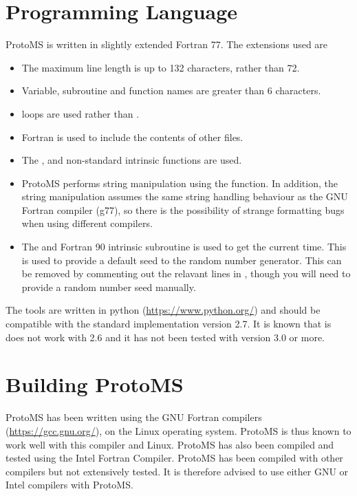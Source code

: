 \documentclass[letterpaper,10pt,english]{sphinxmanual}
\begin{document}
\section{Programming Language}
\label{compilation:fortran77}\label{compilation:programming-language}
ProtoMS is written in slightly extended Fortran 77. The extensions used are
\begin{itemize}
\item {} 
The maximum line length is up to 132 characters, rather than 72.

\item {} 
Variable, subroutine and function names are greater than 6 characters.

\item {} 
 loops are used rather than .

\item {} 
Fortran  is used to include the contents of other files.

\item {} 
The ,  and  non-standard intrinsic functions are used.

\item {} 
ProtoMS performs string manipulation using the  function. In addition, the string manipulation assumes the same string handling behaviour as the GNU Fortran compiler (g77), so there is the possibility of strange formatting bugs when using different compilers.

\item {} 
The  and  Fortran 90 intrinsic subroutine is used to get the current time. This is used to provide a default seed to the random number generator. This can be removed by commenting out the relavant lines in , though you will need to provide a random number seed manually.

\end{itemize}

The tools are written in python (\href{https://www.python.org/}{https://www.python.org/}) and should be compatible with the standard implementation version 2.7. It is known that is does not work with 2.6 and it has not been tested with version 3.0 or more.


\section{Building ProtoMS}
\label{compilation:building-protoms}
ProtoMS has been written using the GNU Fortran compilers (\href{https://gcc.gnu.org/}{https://gcc.gnu.org/}), on the Linux operating system. ProtoMS is thus known to work well with this compiler and Linux. ProtoMS has also been compiled and tested using the Intel Fortran Compiler. ProtoMS has been compiled with other compilers but not extensively tested. It is therefore advised to use either GNU or Intel compilers with ProtoMS.
\end{document}
